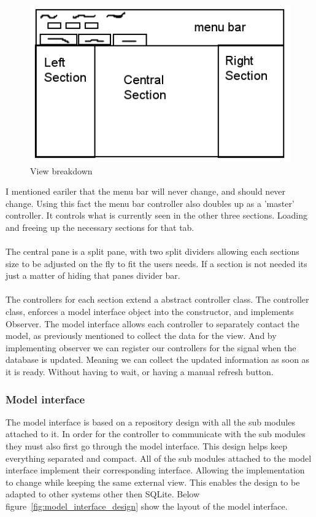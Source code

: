 \begin{figure}[H]
	\centering
	\includegraphics[scale=0.5]{images/view_breakdown.png}
	\caption{View breakdown}
	\label{fig:view_breakdown}
\end{figure}

I mentioned eariler that the menu bar will never change, and should never change. Using this fact the menu bar controller also doubles up as a 'master' controller. It controls what is currently seen in the other three sections. Loading and freeing up the necessary sections for that tab. 
\\\\
The central pane is a split pane, with two split dividers allowing each sections size to be adjusted on the fly to fit the users needs. If a section is not needed its just a matter of hiding that panes divider bar. 
\\\\
The controllers for each section extend a abstract controller class. The controller class, enforces a model interface object into the constructor, and implements Observer. The model interface allows each controller to separately contact the model, as previously mentioned to collect the data for the view. And by implementing observer we can register our controllers for the signal when the database is updated. Meaning we can collect the updated information as soon as it is ready. Without having to wait, or having a manual refresh button.    

\subsubsection{Model interface}
\label{subsubsec:imp_model_interface}

The model interface is based on a repository design with all the sub modules attached to it. In order for the controller to communicate with the sub modules they must also first go through the model interface. This design helps keep everything separated and compact. All of the sub modules attached to the model interface implement their corresponding interface. Allowing the implementation to change while keeping the same external view. This enables the design to be adapted to other systems other then SQLite. Below figure~\ref{fig:model_interface_design} show the layout of the model interface.

